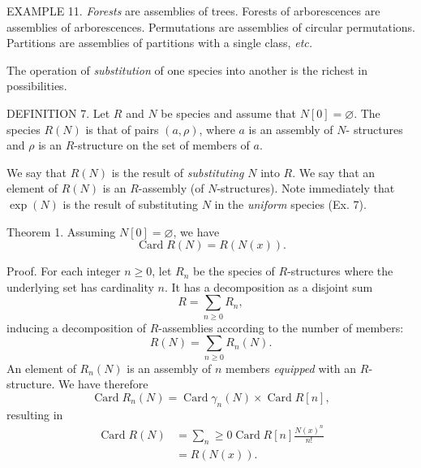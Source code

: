 \documentclass{article}
\theoremstyle{definition}
\theoremstyle{remark}
\DeclareMathOperator{\Card}{Card}
\newcommand{\term}[1]{\emph{#1}}
\newcommand{\etc}{\textit{etc.}\xspace}
\begin{document}
EXAMPLE 11. \term{Forests} are assemblies of trees. Forests of
arborescences are assemblies of arborescences. Permutations are
assemblies of circular permutations. Partitions are assemblies of
partitions with a single class, \etc

The operation of \term{substitution} of one species into another is
the richest in possibilities.

DEFINITION 7. Let $R$ and $N$ be species and assume that $N [0] = \varnothing$.
The species $R (N)$ is that of pairs $(a, \rho)$, where $a$ is an assembly of $N$-
structures and $\rho$ is an $R$-structure on the set of members of $a$.

We say that $R (N)$ is the result of \term{substituting} $N$ into $R$. We
say that an element of $R (N)$ is an $R$-assembly (of $N$-structures). Note
immediately that $\exp (N)$ is the result of substituting $N$ in
the \emph{uniform} species (Ex. 7).

Theorem 1. Assuming $N [0] = \varnothing$, we have
\[ \Card R (N) = R (N (x)). \]

Proof. For each integer $n \geq 0$, let $R_n$ be the species of $R$-structures
where the underlying set has cardinality $n$. It has a decomposition
as a disjoint sum
\[ R = \sum_{n \geq 0} R_n, \]
inducing a decomposition of $R$-assemblies according to the number of
members:
\[ R (N) = \sum_{n \geq 0} R_n(N). \]
An element of $R_n(N)$ is an assembly of $n$ members \emph{equipped} with an $R$-structure.
We have therefore
\[ \Card R_n(N) = \Card \gamma_n(N) \times \Card R [n], \]
resulting in
\begin{align*} \Card R(N) &= \sum_n \geq 0 \Card R[n]
  \frac{N(x)^n}{n!} \\
  &= R(N(x)).
\end{align*}
\end{document}
